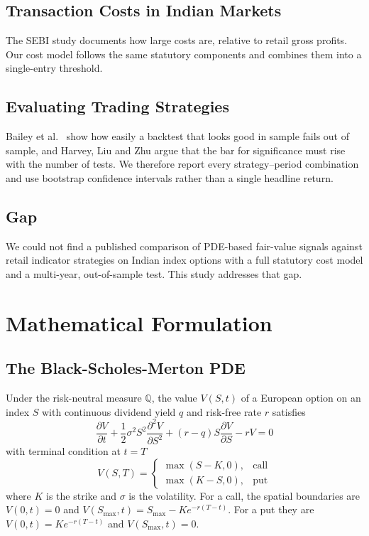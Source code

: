 \documentclass[10pt,journal,compsoc]{IEEEtran}
\begin{document}
\subsection{Transaction Costs in Indian Markets}
The SEBI study \cite{sebi2023study} documents how large costs are, relative to retail gross profits. Our cost model follows the same statutory components and combines them into a single-entry threshold.

\subsection{Evaluating Trading Strategies}
Bailey et al.\ \cite{bailey2017probability} show how easily a backtest that looks good in sample fails out of sample, and Harvey, Liu and Zhu \cite{harvey2016cross} argue that the bar for significance must rise with the number of tests. We therefore report every strategy--period combination and use bootstrap confidence intervals \cite{efron1993bootstrap} rather than a single headline return.

\subsection{Gap}
We could not find a published comparison of PDE-based fair-value signals against retail indicator strategies on Indian index options with a full statutory cost model and a multi-year, out-of-sample test. This study addresses that gap.

\section{Mathematical Formulation}

\subsection{The Black-Scholes-Merton PDE}
Under the risk-neutral measure $\mathbb{Q}$, the value $V(S,t)$ of a European option on an index $S$ with continuous dividend yield $q$ and risk-free rate $r$ satisfies
\begin{equation}
\frac{\partial V}{\partial t} + \frac{1}{2}\sigma^2 S^2 \frac{\partial^2 V}{\partial S^2} + (r - q) S \frac{\partial V}{\partial S} - r V = 0
\label{eq:bsm_pde}
\end{equation}
with terminal condition at $t = T$
\begin{equation}
V(S, T) = \begin{cases}
\max(S - K, 0), & \text{call} \\
\max(K - S, 0), & \text{put}
\end{cases}
\end{equation}
where $K$ is the strike and $\sigma$ is the volatility. For a call, the spatial boundaries are $V(0, t) = 0$ and $V(S_{\max}, t) = S_{\max} - K e^{-r(T-t)}$. For a put they are $V(0, t) = K e^{-r(T-t)}$ and $V(S_{\max}, t) = 0$.
\end{document}
